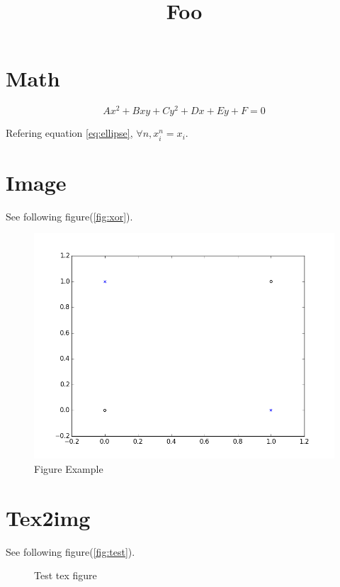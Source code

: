 \documentclass[]{article}
\title{Foo}
\date{}
\begin{document}
\maketitle

\section{Math}\label{math}

\begin{equation}\label{eq:ellipse}
Ax^2 + Bxy + Cy^2 + Dx + Ey + F = 0
\end{equation}

Refering equation \eqref{eq:ellipse}, \(\forall n, x_i^n = x_i\).

\section{Image}\label{image}

See following figure(\autoref{fig:xor}).

\begin{figure}[h]\centering\includegraphics[width=\textwidth]{.//assets/images/xor.png}\caption{Figure Example}\label{fig:xor}\end{figure}

\section{Tex2img}\label{tex2img}

See following figure(\autoref{fig:test}).

\begin{figure}[h]\centering\caption{Test tex figure}\label{fig:test}\end{figure}
\end{document}
